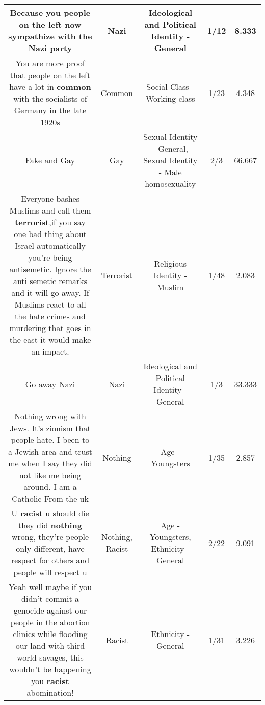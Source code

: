 \documentclass[11pt]{article}
\newlength\mylength
\begin{document}
\begin{center}
\begin{longtable}{|C{.65\mylength}|C{.30\mylength}|C{.12\mylength}|C{.12\mylength}|C{.12\mylength}|}
  \small Because you people on the left now sympathize with the \textbf{Nazi} party\normalsize   & Nazi &  Ideological and Political Identity - General & 1/12 & 8.333 \\  \hline
  \small You are more proof that people on the left have a lot in \textbf{common} with the socialists of Germany in the late 1920s\normalsize   & Common & Social Class - Working class & 1/23 & 4.348 \\  \hline
  \small Fake and Gay\normalsize   & Gay & Sexual Identity - General, Sexual Identity - Male homosexuality & 2/3 & 66.667 \\  \hline
  \small Everyone bashes Muslims and call them \textbf{terrorist},if you say one bad thing about Israel automatically you're being antisemetic. Ignore the anti semetic remarks and it will go away. If Muslims react to all the hate crimes and murdering that goes in the east it would make an impact.\normalsize   & Terrorist & Religious Identity - Muslim & 1/48 & 2.083 \\  \hline
  \small Go away Nazi\normalsize   & Nazi &  Ideological and Political Identity - General & 1/3 & 33.333 \\  \hline
  \small Nothing wrong with Jews.  It's zionism that people hate. I been to a Jewish area and trust me when I say they did not like me being around. I am a Catholic  From the uk\normalsize   & Nothing & Age - Youngsters & 1/35 & 2.857 \\  \hline
  \small U \textbf{racist} u should die they did \textbf{nothing} wrong, they're people only different, have respect for others and people will respect u\normalsize   & Nothing, Racist & Age - Youngsters, Ethnicity - General & 2/22 & 9.091 \\  \hline
  \small Yeah well maybe if you didn't commit a genocide against our people in the abortion clinics while flooding our land with third world savages, this wouldn't be happening you \textbf{racist} abomination!\normalsize   & Racist & Ethnicity - General & 1/31 & 3.226 \\  \hline

\end{longtable}
\end{center}
\end{document}
